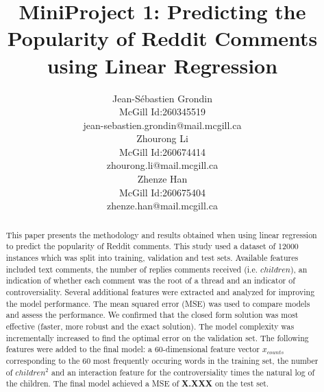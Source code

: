 \documentclass[11pt]{article}
\title{MiniProject 1: Predicting the Popularity of Reddit Comments using Linear Regression}
\author{%
\begin{tabular}{c} Jean-Sébastien Grondin \\ \normalfont McGill Id:260345519  \\ \normalfont \small jean-sebastien.grondin@mail.mcgill.ca \end{tabular} 
\begin{tabular}{c} Zhourong Li \\ \normalfont McGill Id:260674414  \\ \normalfont \small zhourong.li@mail.mcgill.ca \end{tabular} 
\begin{tabular}{c} Zhenze Han \\ \normalfont McGill Id:260675404  \\ \normalfont \small zhenze.han@mail.mcgill.ca \end{tabular} }
\begin{document}
\maketitle

\begin{abstract}
This paper presents the methodology and results obtained when using linear regression to predict the popularity of Reddit comments. This study used a dataset of 12000 instances which was split into training, validation and test sets. Available features included text comments, the number of replies comments received (i.e. $children$), an indication of whether each comment was the root of a thread and an indicator of controversiality.  Several additional features were extracted and analyzed for improving the model performance. The mean squared error (MSE) was used to compare models and assess the performance. We confirmed that the closed form solution was most effective (faster, more robust and the exact solution). The model complexity was incrementally increased to find the optimal error on the validation set. The following features were added to the final model: a 60-dimensional feature vector $x_{counts}$ corresponding to the 60 most frequently occuring words in the training set, the number of $children^{2}$ and an interaction feature for the controversiality times the natural log of the children. The final model achieved a MSE of  \textbf{X.XXX} on the test set. 
\end{abstract}
\end{document}
